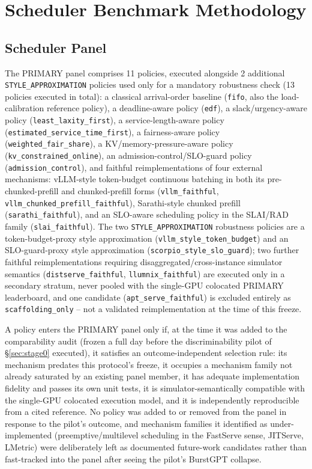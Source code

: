 \section{Scheduler Benchmark Methodology}
\label{sec:methodology}

\subsection{Scheduler Panel}
\label{sec:panel}

The PRIMARY panel comprises 11 policies, executed alongside 2 additional
\texttt{STYLE\_APPROXIMATION} policies used only for a mandatory robustness
check (13 policies executed in total): a classical arrival-order baseline
(\texttt{fifo}, also the load-calibration reference policy), a
deadline-aware policy (\texttt{edf}), a slack/urgency-aware policy
(\texttt{least\_laxity\_first}), a service-length-aware policy
(\texttt{estimated\_service\_time\_first}), a fairness-aware policy
(\texttt{weighted\_fair\_share}), a KV/memory-pressure-aware policy
(\texttt{kv\_constrained\_online}), an admission-control/SLO-guard policy
(\texttt{admission\_control}), and faithful reimplementations of four
external mechanisms: vLLM-style token-budget continuous batching in both
its pre-chunked-prefill and chunked-prefill forms
(\texttt{vllm\_faithful}, \texttt{vllm\_chunked\_prefill\_faithful}),
Sarathi-style chunked prefill (\texttt{sarathi\_faithful}), and an
SLO-aware scheduling policy in the SLAI/RAD family
(\texttt{slai\_faithful}). The two \texttt{STYLE\_APPROXIMATION} robustness
policies are a token-budget-proxy style approximation
(\texttt{vllm\_style\_token\_budget}) and an SLO-guard-proxy style
approximation (\texttt{scorpio\_style\_slo\_guard}); two further faithful
reimplementations requiring disaggregated/cross-instance simulator
semantics (\texttt{distserve\_faithful}, \texttt{llumnix\_faithful}) are
executed only in a secondary stratum, never pooled with the single-GPU
colocated PRIMARY leaderboard, and one candidate
(\texttt{apt\_serve\_faithful}) is excluded entirely as
\texttt{scaffolding\_only} -- not a validated reimplementation at the time
of this freeze.

A policy enters the PRIMARY panel only if, at the time it was added to the
comparability audit (frozen a full day before the discriminability pilot
of \S\ref{sec:stage0} executed), it satisfies an outcome-independent
selection rule: its mechanism predates this protocol's freeze, it
occupies a mechanism family not already saturated by an existing panel
member, it has adequate implementation fidelity and passes its own unit
tests, it is simulator-semantically compatible with the single-GPU
colocated execution model, and it is independently reproducible from a
cited reference. No policy was added to or removed from the panel in
response to the pilot's outcome, and mechanism families it identified as
under-implemented (preemptive/multilevel scheduling in the FastServe
sense, JITServe, LMetric) were deliberately left as documented future-work
candidates rather than fast-tracked into the panel after seeing the
pilot's BurstGPT collapse.

